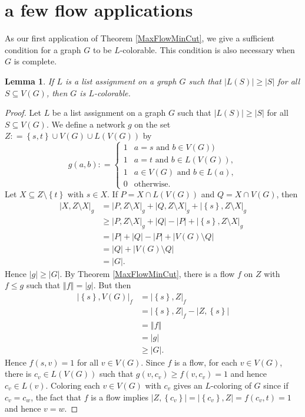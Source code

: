 \documentclass{amsbook}
\theoremstyle{plain}
\newtheorem{lemma}{Lemma}
\numberwithin{equation}{chapter}
\newcommand{\set}[1]{\left\{ #1 \right\}}
\newcommand{\card}[1]{\left|#1\right|}
\newcommand{\size}[1]{\left\Vert#1\right\Vert}
\newcommand{\DefinedAs}{\mathrel{\mathop:}=}
\begin{document}
\section*{a few flow applications}
As our first application of Theorem \ref{MaxFlowMinCut}, we give a sufficient condition for a graph $G$ to be $L$-colorable.  This 
condition is also necessary when $G$ is complete.
\begin{lemma}
If $L$ is a list assignment on a graph $G$ such that $\card{L(S)} \ge \card{S}$ for all $S \subseteq V(G)$, then $G$ is $L$-colorable.
\end{lemma}
\begin{proof}
Let $L$ be a list assignment on a graph $G$ such that $\card{L(S)} \ge \card{S}$ for all $S \subseteq V(G)$.  
We define a network $g$ on the set $Z \DefinedAs \set{s,t} \cup V(G) \cup L(V(G))$ by
\[g(a, b) \DefinedAs  \begin{cases} 
      1 & a = s \text{ and } b \in  V(G))\\
      1 & a = t \text{ and } b \in  L(V(G)),\\
	  1 & a \in V(G) \text{ and } b \in L(a),\\
      0 & \text{otherwise} .
   \end{cases}
\]
Let $X \subseteq Z \setminus \set{t}$ with $s \in X$.  If $P = X \cap L(V(G))$ and $Q = X \cap V(G)$, then
\begin{align*}
\card{X, Z\setminus X}_g &= \card{P, Z\setminus X}_g + \card{Q, Z\setminus X}_g + \card{\set{s}, Z\setminus X}_g\\
&\ge \card{P, Z\setminus X}_g + \card{Q} - \card{P} + \card{\set{s}, Z\setminus X}_g\\
&=\card{P} + \card{Q} - \card{P} + \card{V(G)\setminus Q}\\
&=\card{Q} + \card{V(G)\setminus Q}\\
&= \card{G}.
\end{align*}
Hence $\card{g} \ge \card{G}$.  By Theorem \ref{MaxFlowMinCut}, there is a flow $f$ on $Z$ with $f \le g$ such that $\size{f} = \card{g}$.  But then
\begin{align*}
\card{\set{s}, V(G)}_f &=  \card{\set{s}, Z}_f \\
&= \card{\set{s}, Z}_f - \card{Z, \set{s}}\\
&=\size{f}\\
&= \card{g}\\
&\ge\card{G}.
\end{align*}
Hence $f(s,v) = 1$ for all $v \in V(G)$.  Since $f$ is a flow, for each $v \in V(G)$, there is $c_v \in L(V(G))$ such that $g(v, c_v) \ge f(v, c_v) = 1$ and hence $c_v \in L(v)$.
Coloring each $v \in V(G)$ with $c_v$ gives an $L$-coloring of $G$ since if $c_v = c_w$, the fact that $f$ is a flow implies 
$\card{Z, \set{c_v}} = \card{\set{c_v}, Z} = f(c_v, t) = 1$ and hence $v = w$.
\end{proof}
\end{document}
